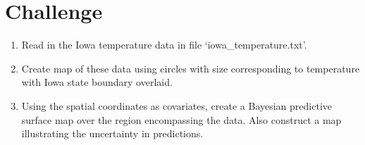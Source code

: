 \documentclass[12pt]{article}
\begin{document}
\section*{Challenge}
\begin{enumerate}
  \item Read in the Iowa temperature data in file `iowa\_temperature.txt'. 
  \item Create map of these data using circles with size corresponding to temperature with Iowa state boundary overlaid. 
  \item Using the spatial coordinates as covariates, create a Bayesian predictive surface map over the region encompassing the data.  Also construct a map illustrating the uncertainty in predictions.  
\end{enumerate}
\end{document}
